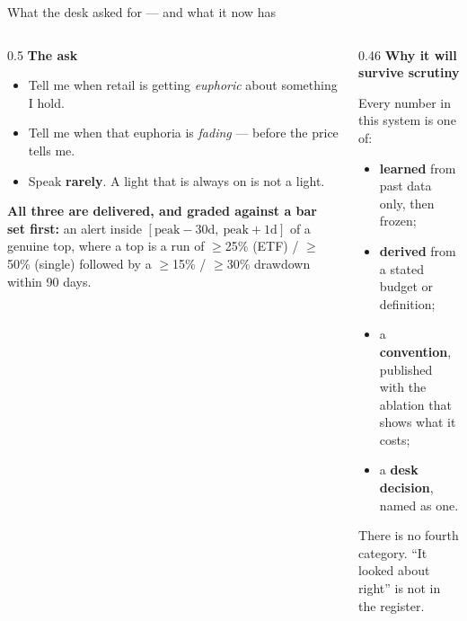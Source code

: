 \documentclass[aspectratio=169,11pt]{beamer}
\begin{document}
\begin{frame}{What the desk asked for --- and what it now has}
  \begin{columns}[T]
    \begin{column}{0.5\linewidth}
      \footnotesize
      \textbf{The ask}
      \begin{itemize}
        \item Tell me when retail is getting \emph{euphoric} about something
              I hold.
        \item Tell me when that euphoria is \emph{fading} --- before the price
              tells me.
        \item Speak \textbf{rarely}. A light that is always on is not a light.
      \end{itemize}
      \vspace{0.4em}
      \textbf{All three are delivered, and graded against a bar set first:} an
      alert inside $[\text{peak}-30\text{d},\ \text{peak}+1\text{d}]$ of a
      genuine top, where a top is a run of $\geq$25\% (ETF) / $\geq$50\%
      (single) followed by a $\geq$15\% / $\geq$30\% drawdown within 90 days.
    \end{column}
    \begin{column}{0.46\linewidth}
      \footnotesize
      \textbf{Why it will survive scrutiny}
      \vspace{0.3em}

      Every number in this system is one of:
      \begin{itemize}
        \item \textbf{learned} from past data only, then frozen;
        \item \textbf{derived} from a stated budget or definition;
        \item a \textbf{convention}, published with the ablation that shows
              what it costs;
        \item a \textbf{desk decision}, named as one.
      \end{itemize}
      \vspace{0.4em}
      {\color{gicgrey}There is no fourth category. ``It looked about right''
       is not in the register.}
    \end{column}
  \end{columns}
\end{frame}
\end{document}

